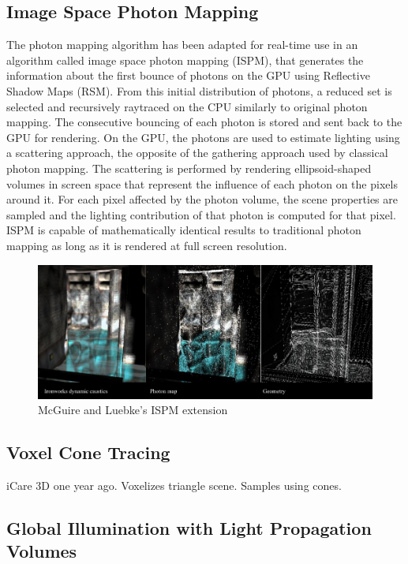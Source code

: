 	\subsection {Image Space Photon Mapping}
		The photon mapping algorithm has been adapted for real-time use in an algorithm called image space photon mapping (ISPM), that generates the information about the first bounce of photons on the GPU using Reflective Shadow Maps (RSM). \cite{dachsbacher2005} 
		From this initial distribution of photons, a reduced set is selected and recursively raytraced on the CPU similarly to original photon mapping. The consecutive bouncing of each photon is stored and sent back to the GPU for rendering. On the GPU, the photons are used to estimate lighting using a scattering approach, the opposite of the gathering approach used by classical photon mapping. The scattering is performed by rendering ellipsoid-shaped volumes in screen space that represent the influence of each photon on the pixels around it. For each pixel affected by the photon volume, the scene properties are sampled and the lighting contribution of that photon is computed for that pixel. ISPM is capable of mathematically identical results to traditional photon mapping as long as it is rendered at full screen resolution.

		\begin{figure}
			\centering
				\includegraphics[width=1.00\textwidth]{Media/ispm.jpg}
			\caption{McGuire and Luebke's ISPM extension}
			\label{fig:ispm}
		\end{figure}
	
	\subsection {Voxel Cone Tracing}
		iCare 3D one year ago. Voxelizes triangle scene. Samples using cones. \cite{crassin2011}

	\subsection {Global Illumination with Light Propagation Volumes}

